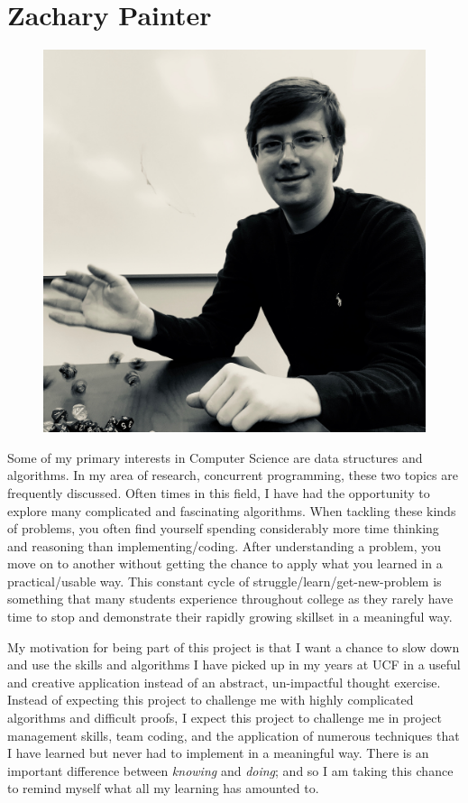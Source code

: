 \documentclass[12pt,a4paper]{report}
\begin{document}
	\newpage
	\section{Zachary Painter}
	\begin{figure}
		\includegraphics[scale=0.05]{Zachary_Painter}
	\end{figure}
	Some of my primary interests in Computer Science are data structures and algorithms. In my area of research, concurrent programming, these two topics are frequently discussed. Often times in this field, I have had the opportunity to explore many complicated and fascinating algorithms. When tackling these kinds of problems, you often find yourself spending considerably more time thinking and reasoning than implementing/coding. After understanding a problem, you move on to another without getting the chance to apply what you learned in a practical/usable way. This constant cycle of struggle/learn/get-new-problem is something that many students experience throughout college as they rarely have time to stop and demonstrate their rapidly growing skillset in a meaningful way. \par
	My motivation for being part of this project is that I want a chance to slow down and use the skills and algorithms I have picked up in my years at UCF in a useful and creative application instead of an abstract, un-impactful thought exercise. Instead of expecting this project to challenge me with highly complicated algorithms and difficult proofs, I expect this project to challenge me in project management skills, team coding, and the application of numerous techniques that I have learned but never had to implement in a meaningful way. There is an important difference between \textit{knowing} and \textit{doing}; and so I am taking this chance to remind myself what all my learning has amounted to. 
	
\end{document}
